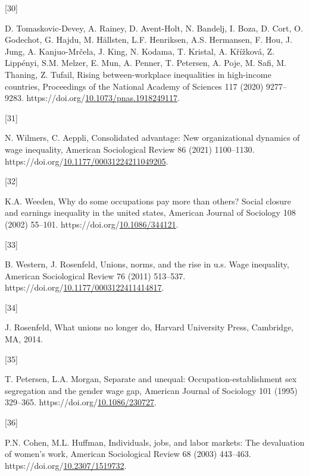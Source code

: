 \documentclass[
  11pt,
]{article}
\newlength{\cslhangindent}
\newlength{\csllabelwidth}
\newenvironment{CSLReferences}[2] %
 {\begin{list}{}{%
  \setlength{\itemindent}{0pt}
  \setlength{\leftmargin}{0pt}
  \setlength{\parsep}{0pt}
  \ifodd #1
   \setlength{\leftmargin}{\cslhangindent}
   \setlength{\itemindent}{-1\cslhangindent}
  \fi
  \setlength{\itemsep}{#2\baselineskip}}}
 {\end{list}}
\newcommand{\CSLLeftMargin}[1]{\parbox[t]{\csllabelwidth}{\strut#1\strut}}
\newcommand{\CSLRightInline}[1]{\parbox[t]{\linewidth - \csllabelwidth}{\strut#1\strut}}
\begin{document}
\begin{CSLReferences}{0}{0}
\CSLLeftMargin{{[}30{]} }%
\CSLRightInline{D. Tomaskovic-Devey, A. Rainey, D. Avent-Holt, N.
Bandelj, I. Boza, D. Cort, O. Godechot, G. Hajdu, M. Hällsten, L.F.
Henriksen, A.S. Hermansen, F. Hou, J. Jung, A. Kanjuo-Mrčela, J. King,
N. Kodama, T. Kristal, A. Křížková, Z. Lippényi, S.M. Melzer, E. Mun, A.
Penner, T. Petersen, A. Poje, M. Safi, M. Thaning, Z. Tufail, Rising
between-workplace inequalities in high-income countries, Proceedings of
the National Academy of Sciences 117 (2020) 9277--9283.
https://doi.org/\href{https://doi.org/10.1073/pnas.1918249117}{10.1073/pnas.1918249117}.}

\CSLLeftMargin{{[}31{]} }%
\CSLRightInline{N. Wilmers, C. Aeppli, Consolidated advantage: New
organizational dynamics of wage inequality, American Sociological Review
86 (2021) 1100--1130.
https://doi.org/\href{https://doi.org/10.1177/00031224211049205}{10.1177/00031224211049205}.}

\CSLLeftMargin{{[}32{]} }%
\CSLRightInline{K.A. Weeden, Why do some occupations pay more than
others? Social closure and earnings inequality in the united states,
American Journal of Sociology 108 (2002) 55--101.
https://doi.org/\href{https://doi.org/10.1086/344121}{10.1086/344121}.}

\CSLLeftMargin{{[}33{]} }%
\CSLRightInline{B. Western, J. Rosenfeld, Unions, norms, and the rise in
u.s. Wage inequality, American Sociological Review 76 (2011) 513--537.
https://doi.org/\href{https://doi.org/10.1177/0003122411414817}{10.1177/0003122411414817}.}

\CSLLeftMargin{{[}34{]} }%
\CSLRightInline{J. Rosenfeld, What unions no longer do, Harvard
University Press, Cambridge, MA, 2014.}

\CSLLeftMargin{{[}35{]} }%
\CSLRightInline{T. Petersen, L.A. Morgan, Separate and unequal:
Occupation-establishment sex segregation and the gender wage gap,
American Journal of Sociology 101 (1995) 329--365.
https://doi.org/\href{https://doi.org/10.1086/230727}{10.1086/230727}.}

\CSLLeftMargin{{[}36{]} }%
\CSLRightInline{P.N. Cohen, M.L. Huffman, Individuals, jobs, and labor
markets: The devaluation of women's work, American Sociological Review
68 (2003) 443--463.
https://doi.org/\href{https://doi.org/10.2307/1519732}{10.2307/1519732}.}


\end{CSLReferences}
\end{document}
